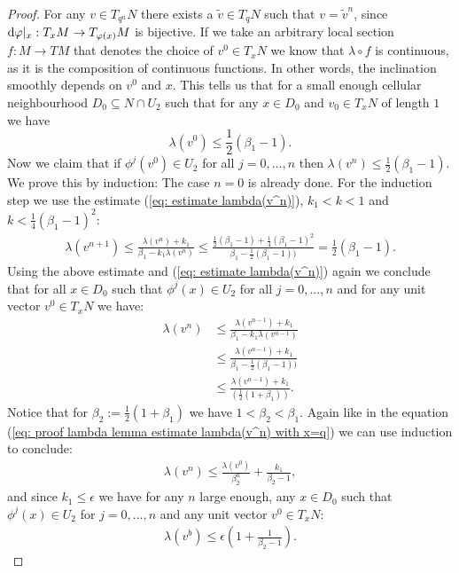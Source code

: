 \begin{proof}
For any $v\in T_{q^n}N$ there exists a $\tilde{v} \in T_qN$ such that $v=\tilde{v}^n$, since
 $\mathop{}\!\mathrm{d} \varphi|_x:T_xM \to T_{\varphi(x)}M$ is bijective. 
 If we take an arbitrary local section $f:M \to TM$
  that denotes the choice of $v^0\in T_xN$ we know that $\lambda \circ f$ is continuous, 
  as it is the composition of continuous functions. In other words, the inclination smoothly depends on $v^0$ and $x$. 
This tells us that for a small enough cellular neighbourhood $D_0 \subseteq N \cap U_2$ such that for any $x\in D_0$ and $v_0\in T_xN$ of length $1$ we have
\begin{equation}
\lambda(v^0)\leq \frac{1}{2} (\beta_1-1).
\end{equation}
Now we claim that if $\phi^j(v^0)\in U_2$ for all $j=0,...,n$ then $\lambda(v^n)\leq \frac{1}{2}(\beta_1-1).$ We prove this by induction: The case $n=0$ is already done. For the induction step we use the estimate (\ref{eq: estimate lambda(v^n)}), $k_1 <k<1$ and $k< \frac{1}{4}(\beta_1-1)^2$:
\begin{align*}
\lambda(v^{n+1})\leq \frac{\lambda(v^{n})+k_1}{ \beta_1  - k_1 \lambda(v^{n})}\leq \frac{ \frac{1}{2}(\beta_1-1)+\frac{1}{4}(\beta_1-1)^2}{ \beta_1  - \frac{1}{2}(\beta_1-1))} = \frac{1}{2}(\beta_1-1).
\end{align*} Using the above estimate and (\ref{eq: estimate lambda(v^n)}) again we conclude that for all $x\in D_0$ such that $\phi^j(x)\in U_2$ for all $j=0,...,n$ and for any unit vector $v^0\in T_xN$ we have:
\begin{align*}
\lambda(v^{n})& \leq \frac{\lambda(v^{n-1})+k_1}{ \beta_1  - k_1 \lambda(v^{n-1})}\\
 &\leq \frac{\lambda(v^{n-1})+k_1}{ \beta_1  - \frac{1}{2}(\beta_1-1))}\\
 &\leq \frac{\lambda(v^{n-1})+k_1}{ (\frac{1}{2}(1+\beta_1))}.
\end{align*} Notice that for $\beta_2:=\frac{1}{2}(1+\beta_1)$ we have $1<\beta_2<\beta_1$. Again like in the equation (\ref{eq: proof lambda lemma estimate lambda(v^n) with x=q}) we can use induction to conclude:
\begin{align*}
\lambda(v^n)\leq \frac{\lambda(v^0)}{\beta_2^n}+\frac{k_1}{\beta_2-1},
\end{align*} and since $k_1\leq \epsilon$ we have for any $n$ large enough, any $x\in D_0$ such that $\phi^j(x) \in U_2$ for $j=0,...,n$ and any unit vector $v^0 \in T_xN$:
\begin{align*}
\lambda(v^b)\leq \epsilon(1+\frac{1}{\beta_2-1}).
\end{align*}

\end{proof}
